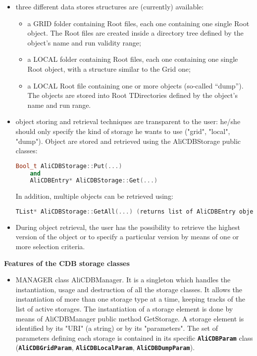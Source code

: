 \documentclass[12pt,a4paper,twoside]{article}
\newcommand{\class}[1]{\texttt{\textbf{#1}}\xspace}
\begin{document}
{\begin{itemize}
\item three different data stores structures are (currently) available:
  \begin{itemize}
  \item a GRID folder containing Root files, each one containing one 
    single Root object. The Root files are created inside a directory tree 
    defined by the object's name and run validity range;
    
  \item a LOCAL folder containing Root files, each one containing one
    single Root object, with a structure similar to the Grid one;

  \item a LOCAL Root file containing one or more objects (so-called ``dump''). The 
    objects are stored into Root TDirectories defined by the
    object's name and run range.
  \end{itemize}

\item object storing and retrieval techniques are transparent to the user: 
  he/she should only specify the kind of storage he wants to use ("grid", 
  "local", "dump"). Object are stored and retrieved using the AliCDBStorage 
  public classes:

  \begin{lstlisting}[language=C++]
    Bool_t AliCDBStorage::Put(...) 
    and 
    AliCDBEntry* AliCDBStorage::Get(...) 
  \end{lstlisting}

  In addition, multiple objects can be retrieved using:

  \begin{lstlisting}[language=C++]
    TList* AliCDBStorage::GetAll(...) (returns list of AliCDBEntry objects).
  \end{lstlisting}

\item During object retrieval, the user has the possibility to retrieve the 
  highest version of the object or to specify a particular version by means 
  of one or more selection criteria.
\end{itemize} 

\noindent
\textbf{Features of the CDB storage classes}


\begin{itemize}
\item MANAGER class AliCDBManager. It is a singleton which handles 
  the instantiation, usage and destruction of all the storage classes. It 
  allows the instantiation of more than one storage type at a time, keeping 
  tracks of the list of active storages. The instantiation of a storage 
  element is done by means of AliCDBManager public method GetStorage. A 
  storage element is identified by its "URI" (a string) or by its 
  "parameters". The set of parameters defining each storage is contained in 
  its specific \class{AliCDBParam} class (\class{AliCDBGridParam}, \class{AliCDBLocalParam}, 
  \class{AliCDBDumpParam}).
  

\end{itemize}}
\end{document}
